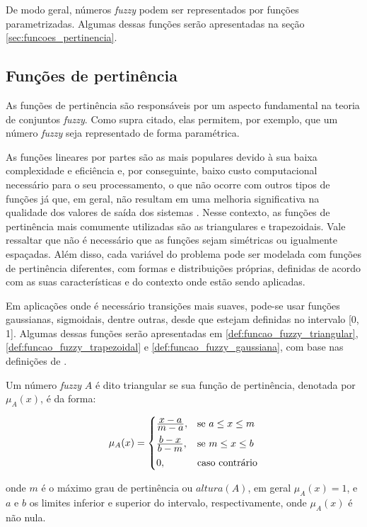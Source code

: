 De modo geral, números \emph{fuzzy} podem ser representados por funções parametrizadas. Algumas dessas funções serão apresentadas na seção \ref{sec:funcoes_pertinencia}.

\subsection{Funções de pertinência}
\label{sec:funcoes_pertinencia}
As funções de pertinência são responsáveis por um aspecto fundamental na teoria de conjuntos \emph{fuzzy}. Como supra citado, elas permitem, por exemplo, que um número \emph{fuzzy} seja representado de forma paramétrica.

As funções lineares por partes são as mais populares devido à sua baixa complexidade e eficiência e, por conseguinte, baixo custo computacional necessário para o seu processamento, o que não ocorre com outros tipos de funções já que, em geral, não resultam em uma melhoria significativa na qualidade dos valores de saída dos sistemas \citep{yen:99}. Nesse contexto, as funções de pertinência mais comumente utilizadas são as triangulares e trapezoidais. Vale ressaltar que não é necessário que as funções sejam simétricas ou igualmente  espaçadas. Além disso, cada variável do problema pode ser modelada com funções de pertinência diferentes,  com  formas  e  distribuições  próprias, definidas  de  acordo com  as suas características e do contexto onde estão sendo aplicadas.

Em aplicações onde é necessário transições mais suaves, pode-se usar funções gaussianas, sigmoidais, dentre outras, desde que estejam definidas no intervalo [0, 1]. Algumas dessas funções serão apresentadas em \ref{def:funcao_fuzzy_triangular}, \ref{def:funcao_fuzzy_trapezoidal} e \ref{def:funcao_fuzzy_gaussiana}, com base nas definições de \citet{sumathi:10}.

\begin{defn}
\label{def:funcao_fuzzy_triangular}
Um número \emph{fuzzy} $A$ é dito triangular se sua função de pertinência, denotada por $\mu_{A}(x)$, é da forma:

\begin{equation}
  \mu_A(x) =  \begin{cases}
                \frac{\displaystyle x - a}{\displaystyle m - a}, & \text{se}\ a \leq x \leq m\\[0.5em]
                \frac{\displaystyle b - x}{\displaystyle b - m}, & \text{se}\ m \leq x \leq b\\[0.5em]
                0, & \text{caso contrário}
              \end{cases}
\end{equation}
\end{defn}
\noindent onde $m$ é o máximo grau de pertinência ou $altura(A)$, em geral $\mu_A(x) = 1$, e $a$ e $b$ os limites inferior e superior do intervalo, respectivamente, onde $\mu_A(x)$ é não nula.

